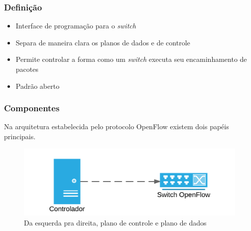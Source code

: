 %
%
\begin{frame}\frametitle{Definição}

    \begin{itemize}
        \setlength{\itemsep}{.5cm}
        \item Interface de programação para o \emph{switch}
        \item Separa de maneira clara os planos de dados e de controle
        \item Permite controlar a forma como um \emph{switch} executa seu 
            encaminhamento de pacotes
        \item Padrão aberto
    \end{itemize}
\end{frame}


%
%
\begin{frame}\frametitle{Componentes}
    Na arquitetura estabelecida pelo protocolo OpenFlow existem dois papéis
    principais.

    \begin{figure}[h]
        \centering
        \includegraphics{images/controller-secure-switch}
        \caption{Da esquerda pra direita, plano de controle e plano de dados}
    \end{figure}

\end{frame}


